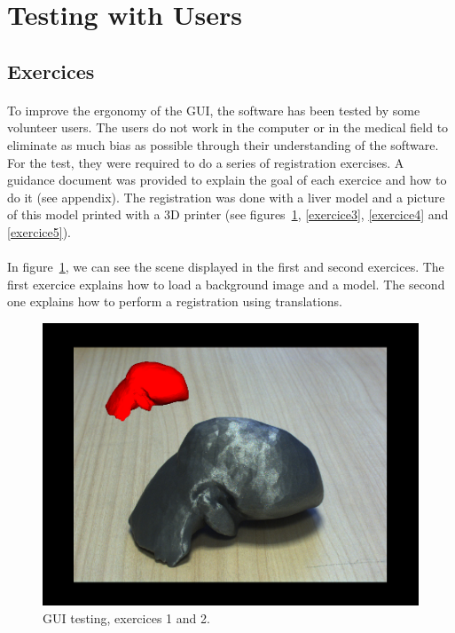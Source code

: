 \documentclass[12pt]{report}
\begin{document}
\section{Testing with Users}

\subsection{Exercices}

\paragraph{}
	To improve the ergonomy of the GUI, the software has been tested by some volunteer users. The users do not work in the computer or in the medical field to eliminate as much bias as possible through their understanding of the software. For the test, they were required to do a series of registration exercises. A guidance document was provided to explain the goal of each exercice and how to do it (see appendix). The registration was done with a liver model and a picture of this model printed with a 3D printer (see figures~\ref{exercice1}, \ref{exercice3}, \ref{exercice4} and \ref{exercice5}).

\paragraph{}
	In figure~\ref{exercice1}, we can see the scene displayed in the first and second exercices. The first exercice explains how to load a background image and a model. The second one explains how to perform a registration using translations.
	
\vspace{10pt}
\begin{figure}[H]
\centerline{\includegraphics[scale = 0.3]{img/exercice1.png}}
\caption{GUI testing, exercices 1 and 2.}
\label{exercice1}
\end{figure}
\end{document}
